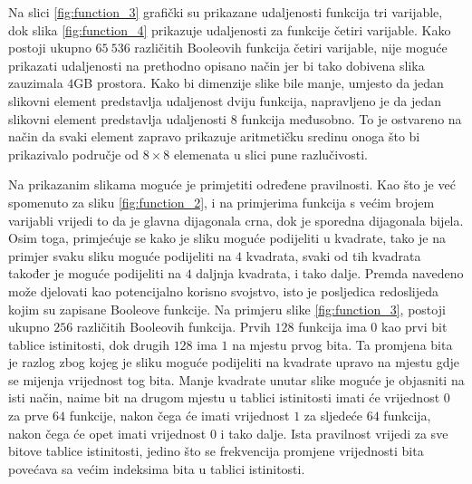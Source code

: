 Na slici \ref{fig:function_3} grafički su prikazane udaljenosti funkcija tri varijable, dok slika \ref{fig:function_4} prikazuje udaljenosti za funkcije četiri varijable. 
Kako postoji ukupno $65\:536$ različitih Booleovih funkcija četiri varijable, nije moguće prikazati udaljenosti na prethodno opisano način jer bi tako dobivena slika zauzimala $4$GB prostora.
Kako bi dimenzije slike bile manje, umjesto da jedan slikovni element predstavlja udaljenost dviju funkcija, napravljeno je da jedan slikovni element predstavlja udaljenosti $8$ funkcija međusobno.
To je ostvareno na način da svaki element zapravo prikazuje aritmetičku sredinu onoga što bi prikazivalo područje od $8\times8$ elemenata u slici pune razlučivosti.

Na prikazanim slikama moguće je primjetiti određene pravilnosti.
Kao što je već spomenuto za sliku \ref{fig:function_2}, i na primjerima funkcija s većim brojem varijabli vrijedi to da je glavna dijagonala crna, dok je sporedna dijagonala bijela.
Osim toga, primjećuje se kako je sliku moguće podijeliti u kvadrate, tako je na primjer svaku sliku moguće podijeliti na $4$ kvadrata, svaki od tih kvadrata također je moguće podijeliti na $4$ daljnja kvadrata, i tako dalje.
Premda navedeno može djelovati kao potencijalno korisno svojstvo, isto je posljedica redoslijeda kojim su zapisane Booleove funkcije.
Na primjeru slike \ref{fig:function_3}, postoji ukupno $256$ različitih Booleovih funkcija.
Prvih $128$ funkcija ima $0$ kao prvi bit tablice istinitosti, dok drugih $128$ ima $1$ na mjestu prvog bita.
Ta promjena bita je razlog zbog kojeg je sliku moguće podijeliti na kvadrate upravo na mjestu gdje se mijenja vrijednost tog bita.
Manje kvadrate unutar slike moguće je objasniti na isti način, naime bit na drugom mjestu u tablici istinitosti imati će vrijednost $0$ za prve $64$ funkcije, nakon čega će imati vrijednost $1$ za sljedeće $64$ funkcija, nakon čega će opet imati vrijednost $0$ i tako dalje.
Ista pravilnost vrijedi za sve bitove tablice istinitosti, jedino što se frekvencija promjene vrijednosti bita povećava sa većim indeksima bita u tablici istinitosti.


